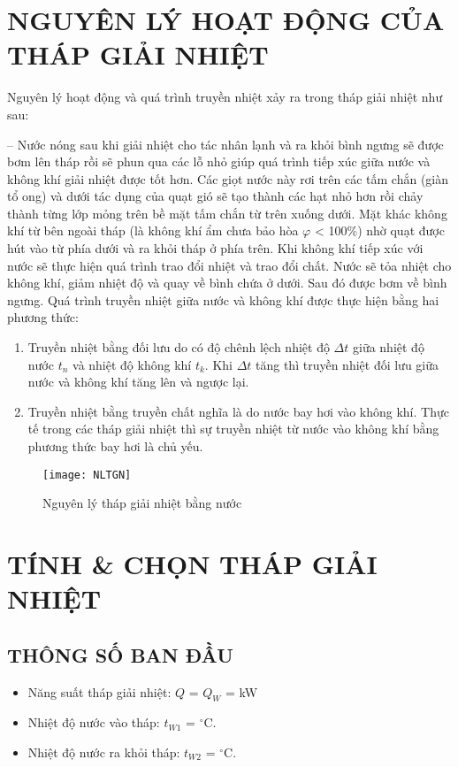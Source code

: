 \section{NGUYÊN LÝ HOẠT ĐỘNG CỦA THÁP GIẢI NHIỆT}
Nguyên lý hoạt động và quá trình truyền nhiệt xảy ra trong tháp giải nhiệt như sau: 

\medskip
-- Nước nóng sau khi giải nhiệt cho tác nhân lạnh và ra khỏi bình ngưng sẽ được bơm lên tháp rồi sẽ phun qua các lỗ nhỏ giúp quá trình tiếp xúc giữa nước và không khí giải nhiệt được tốt hơn. Các giọt nước này rơi trên các tấm chắn (giàn tổ ong) và dưới tác dụng của quạt gió sẽ tạo thành các hạt nhỏ hơn rồi chảy thành từng lớp mỏng trên bề mặt tấm chắn từ trên xuống dưới. Mặt khác không khí từ bên ngoài tháp (là không khí ẩm chưa bảo hòa $\varphi$ < 100\%) nhờ quạt được hút vào từ phía dưới và ra khỏi tháp ở phía trên. Khi không khí tiếp xúc với nước sẽ thực hiện quá trình trao đổi nhiệt và trao đổi chất. Nước sẽ tỏa nhiệt cho không khí, giảm nhiệt độ và quay về bình chứa ở dưới. Sau đó được bơm về bình ngưng. Quá trình truyền nhiệt giữa nước và không khí được thực hiện bằng hai phương thức:
\begin{enumerate}
	\item Truyền nhiệt bằng đối lưu do có độ chênh lệch nhiệt độ $\Delta t$ giữa nhiệt độ nước $t_{n}$ và nhiệt độ không khí $t_{k}$. Khi $\Delta t$ tăng thì truyền nhiệt đối lưu giữa nước và không khí tăng lên và ngược lại.
	\item Truyền nhiệt bằng truyền chất nghĩa là do nước bay hơi vào không khí. Thực tế trong các tháp giải nhiệt thì sự truyền nhiệt từ nước vào không khí bằng phương thức bay hơi là chủ yếu.
\end{enumerate}
\begin{figure}[H]
	\centering
	\texttt{[image: NLTGN]}
	\caption{Nguyên lý tháp giải nhiệt bằng nước}
\end{figure}

\section{TÍNH \& CHỌN THÁP GIẢI NHIỆT}
\subsection{THÔNG SỐ BAN ĐẦU}
\begin{itemize}
	\item Năng suất tháp giải nhiệt: $Q$ = $Q_{W}$ = kW
	\item Nhiệt độ nước vào tháp: $ t_{W1} $ = $^{\circ}$C.
	\item Nhiệt độ nước ra khỏi tháp: $ t_{W2} $ = $^{\circ}$C.
\end{itemize}

